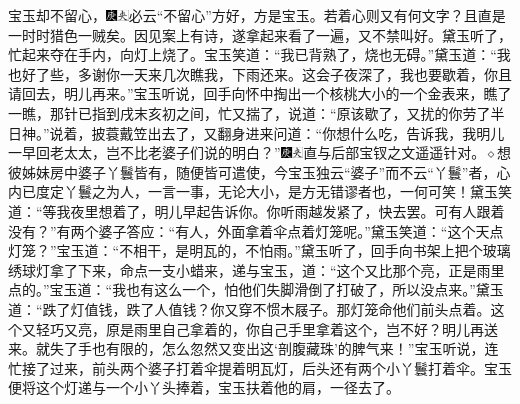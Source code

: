 宝玉却不留心，{\includegraphics[width=3mm]{../Images/00004}\includegraphics[width=3mm]{../Images/00012}\footnotesize \kaishu 必云“不留心”方好，方是宝玉。若着心则又有何文字？且直是一时时猎色一贼矣。}因见案上有诗，遂拿起来看了一遍，又不禁叫好。黛玉听了，忙起来夺在手内，向灯上烧了。宝玉笑道：“我已背熟了，烧也无碍。”黛玉道：“我也好了些，多谢你一天来几次瞧我，下雨还来。这会子夜深了，我也要歇着，你且请回去，明儿再来。”宝玉听说，回手向怀中掏出一个核桃大小的一个金表来，瞧了一瞧，那针已指到戌末亥初之间，忙又揣了，说道：“原该歇了，又扰的你劳了半日神。”说着，披蓑戴笠出去了，又翻身进来问道：“你想什么吃，告诉我，我明儿一早回老太太，岂不比老婆子们说的明白？”{\includegraphics[width=3mm]{../Images/00004}\includegraphics[width=3mm]{../Images/00012}\footnotesize \kaishu 直与后部宝钗之文遥遥针对。{$\diamond$}想彼姊妹房中婆子丫鬟皆有，随便皆可遣使，今宝玉独云“婆子”而不云“丫鬟”者，心内已度定丫鬟之为人，一言一事，无论大小，是方无错谬者也，一何可笑！}黛玉笑道：“等我夜里想着了，明儿早起告诉你。你听雨越发紧了，快去罢。可有人跟着没有？”有两个婆子答应：“有人，外面拿着伞点着灯笼呢。”黛玉笑道：“这个天点灯笼？”宝玉道：“不相干，是明瓦的，不怕雨。”黛玉听了，回手向书架上把个玻璃绣球灯拿了下来，命点一支小蜡来，递与宝玉，道：“这个又比那个亮，正是雨里点的。”宝玉道：“我也有这么一个，怕他们失脚滑倒了打破了，所以没点来。”黛玉道：“跌了灯值钱，跌了人值钱？你又穿不惯木屐子。那灯笼命他们前头点着。这个又轻巧又亮，原是雨里自己拿着的，你自己手里拿着这个，岂不好？明儿再送来。就失了手也有限的，怎么忽然又变出这‘剖腹藏珠’的脾气来！”宝玉听说，连忙接了过来，前头两个婆子打着伞提着明瓦灯，后头还有两个小丫鬟打着伞。宝玉便将这个灯递与一个小丫头捧着，宝玉扶着他的肩，一径去了。

